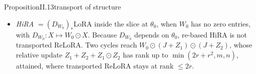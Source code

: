 \begin{restate}{Proposition}{II.13}{transport of structure}
\begin{itemize}
    BAT mode, $\Delta W=\operatorname{blocks}(W_0)\,M+M$ blockwise, is linear in the trained block $M$ but depends on
    $\theta_0$, so it is not additive. These frame readings of FourierFT and C3A are for \texttt{init\_weights=True}; HF's
    defaults start off $\theta_0$ (FourierFT draws its spectrum from $\mathcal N(0,1)$ with scaling $150$, so at $768^2$
    with $1000$ frequencies $\lVert\Delta W_0\rVert_F\approx4.3$, about $14\%$ of a std-$0.04$ $W_0$; C3A is
    Xavier-uniform), and these are objects with a pointing defect.
  \item \emph{HiRA} $=(D_{W_0})_*\mathrm{LoRA}$ inside the slice at $\theta_0$, when $W_0$ has no zero entries, with
    $D_{W_0}:X\mapsto W_0\odot X$. Because $D_{W_0}$ depends on $\theta_0$, re-based HiRA is not transported ReLoRA. Two
    cycles reach $W_0\odot(J+Z_1)\odot(J+Z_2)$, whose relative update $Z_1+Z_2+Z_1\odot Z_2$ has rank up to
    $\min(2r+r^2,m,n)$, attained, where transported ReLoRA stays at rank $\le2r$.
\end{itemize}
\end{restate}

